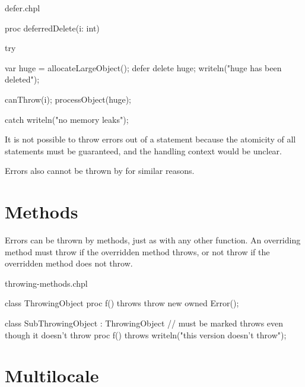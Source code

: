 \begin{chapelexample}{defer.chpl}
\begin{chapel}
proc deferredDelete(i: int) {
  try {
    var huge = allocateLargeObject();
    defer {
      delete huge;
      writeln("huge has been deleted");
    }

    canThrow(i);
    processObject(huge);
  } catch {
    writeln("no memory leaks");
  }
}
\end{chapel}
\begin{chapelpost}
\end{chapelpost}
\begin{chapeloutput}
\end{chapeloutput}
\end{chapelexample}

It is not possible to throw errors out of a  statement because the
atomicity of all  statements must be guaranteed, and the handling
context would be unclear.

Errors also cannot be thrown by  for similar reasons.


\section{Methods}
\label{Errors_Methods}

Errors can be thrown by methods, just as with any other function.
An overriding method must throw if the overridden method throws,
or not throw if the overridden method does not throw.

\begin{chapelexample}{throwing-methods.chpl}
\begin{chapel}
class ThrowingObject {
  proc f() throws {
    throw new owned Error();
  }
}

class SubThrowingObject : ThrowingObject {
  // must be marked throws even though it doesn't throw
  proc f() throws {
    writeln("this version doesn't throw");
  }
}
\end{chapel}
\begin{chapelpost}
\end{chapelpost}
\begin{chapeloutput}
\end{chapeloutput}
\end{chapelexample}


\section{Multilocale}
\label{Errors_Multilocale}

